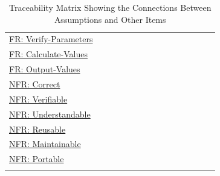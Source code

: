 \documentclass[12pt]{article}
\begin{document}
\begin{longtable}{l l l l l l l l l l l l l l l}
\hyperref[verifyParams]{FR: Verify-Parameters} &  &  &  &  &  &  &  &  &  &  &  &  &  & 
\\
\hyperref[calcValues]{FR: Calculate-Values} &  &  &  &  &  &  &  &  &  &  &  &  &  & 
\\
\hyperref[outputValues]{FR: Output-Values} &  &  &  &  &  &  &  &  &  &  &  &  &  & 
\\
\hyperref[correct]{NFR: Correct} &  &  &  &  &  &  &  &  &  &  &  &  &  & 
\\
\hyperref[verifiable]{NFR: Verifiable} &  &  &  &  &  &  &  &  &  &  &  &  &  & 
\\
\hyperref[understandable]{NFR: Understandable} &  &  &  &  &  &  &  &  &  &  &  &  &  & 
\\
\hyperref[reusable]{NFR: Reusable} &  &  &  &  &  &  &  &  &  &  &  &  &  & 
\\
\hyperref[maintainable]{NFR: Maintainable} &  &  &  &  &  &  &  &  &  &  &  &  &  & 
\\
\hyperref[portable]{NFR: Portable} &  &  &  &  &  &  &  &  &  &  &  &  &  & 
\\
\bottomrule
\caption{Traceability Matrix Showing the Connections Between Assumptions and Other Items}
\label{Table:TraceMatAvsAll}
\end{longtable}
\end{document}
